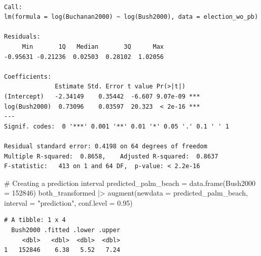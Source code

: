\documentclass[
  letterpaper,
  DIV=11,
  numbers=noendperiod]{scrartcl}
\newenvironment{Shaded}{\begin{snugshade}}{\end{snugshade}}
\newcommand{\AttributeTok}[1]{\textcolor[rgb]{0.40,0.45,0.13}{#1}}
\newcommand{\CommentTok}[1]{\textcolor[rgb]{0.37,0.37,0.37}{#1}}
\newcommand{\DecValTok}[1]{\textcolor[rgb]{0.68,0.00,0.00}{#1}}
\newcommand{\FloatTok}[1]{\textcolor[rgb]{0.68,0.00,0.00}{#1}}
\newcommand{\FunctionTok}[1]{\textcolor[rgb]{0.28,0.35,0.67}{#1}}
\newcommand{\NormalTok}[1]{\textcolor[rgb]{0.00,0.23,0.31}{#1}}
\newcommand{\OtherTok}[1]{\textcolor[rgb]{0.00,0.23,0.31}{#1}}
\newcommand{\SpecialCharTok}[1]{\textcolor[rgb]{0.37,0.37,0.37}{#1}}
\newcommand{\StringTok}[1]{\textcolor[rgb]{0.13,0.47,0.30}{#1}}
\begin{document}
\begin{verbatim}

Call:
lm(formula = log(Buchanan2000) ~ log(Bush2000), data = election_wo_pb)

Residuals:
     Min       1Q   Median       3Q      Max 
-0.95631 -0.21236  0.02503  0.28102  1.02056 

Coefficients:
              Estimate Std. Error t value Pr(>|t|)    
(Intercept)   -2.34149    0.35442  -6.607 9.07e-09 ***
log(Bush2000)  0.73096    0.03597  20.323  < 2e-16 ***
---
Signif. codes:  0 '***' 0.001 '**' 0.01 '*' 0.05 '.' 0.1 ' ' 1

Residual standard error: 0.4198 on 64 degrees of freedom
Multiple R-squared:  0.8658,    Adjusted R-squared:  0.8637 
F-statistic:   413 on 1 and 64 DF,  p-value: < 2.2e-16
\end{verbatim}

\begin{Shaded}
\begin{Highlighting}[]
\CommentTok{\# Creating a prediction interval}
\NormalTok{predicted\_palm\_beach }\OtherTok{=} \FunctionTok{data.frame}\NormalTok{(}\AttributeTok{Bush2000 =} \DecValTok{152846}\NormalTok{)}
\NormalTok{both\_transformed }\SpecialCharTok{|\textgreater{}} \FunctionTok{augment}\NormalTok{(}\AttributeTok{newdata =}\NormalTok{ predicted\_palm\_beach, }\AttributeTok{interval =} \StringTok{"prediction"}\NormalTok{, }\AttributeTok{conf.level =} \FloatTok{0.95}\NormalTok{)}
\end{Highlighting}
\end{Shaded}

\begin{verbatim}
# A tibble: 1 x 4
  Bush2000 .fitted .lower .upper
     <dbl>   <dbl>  <dbl>  <dbl>
1   152846    6.38   5.52   7.24
\end{verbatim}
\end{document}
